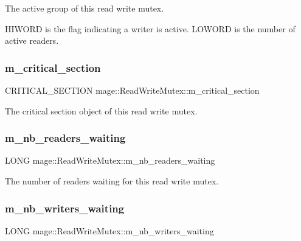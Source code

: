 The active group of this read write mutex.

H\+I\+W\+O\+RD is the flag indicating a writer is active. L\+O\+W\+O\+RD is the number of active readers. \hypertarget{structmage_1_1_read_write_mutex_a77fe51b87e5205d60ea045fa53bc1fa3}{}\label{structmage_1_1_read_write_mutex_a77fe51b87e5205d60ea045fa53bc1fa3} 
\subsubsection{\texorpdfstring{m\+\_\+critical\+\_\+section}{m\_critical\_section}}
{\footnotesize\ttfamily C\+R\+I\+T\+I\+C\+A\+L\+\_\+\+S\+E\+C\+T\+I\+ON mage\+::\+Read\+Write\+Mutex\+::m\+\_\+critical\+\_\+section\hspace{0.3cm}{\ttfamily [private]}}

The critical section object of this read write mutex. \hypertarget{structmage_1_1_read_write_mutex_acbe7553fff7cca2656f6f2b8f0471484}{}\label{structmage_1_1_read_write_mutex_acbe7553fff7cca2656f6f2b8f0471484} 
\subsubsection{\texorpdfstring{m\+\_\+nb\+\_\+readers\+\_\+waiting}{m\_nb\_readers\_waiting}}
{\footnotesize\ttfamily L\+O\+NG mage\+::\+Read\+Write\+Mutex\+::m\+\_\+nb\+\_\+readers\+\_\+waiting\hspace{0.3cm}{\ttfamily [private]}}

The number of readers waiting for this read write mutex. \hypertarget{structmage_1_1_read_write_mutex_a003313794a9b43f80bd9b258b039438d}{}\label{structmage_1_1_read_write_mutex_a003313794a9b43f80bd9b258b039438d} 
\subsubsection{\texorpdfstring{m\+\_\+nb\+\_\+writers\+\_\+waiting}{m\_nb\_writers\_waiting}}
{\footnotesize\ttfamily L\+O\+NG mage\+::\+Read\+Write\+Mutex\+::m\+\_\+nb\+\_\+writers\+\_\+waiting\hspace{0.3cm}{\ttfamily [private]}}

